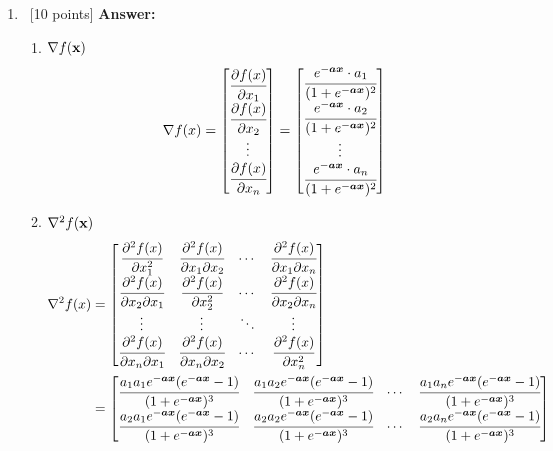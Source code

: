 \documentclass[12pt, fullpage,letterpaper]{article}
\begin{document}
\begin{enumerate}
\item~[10 points]
\textbf{Answer:}
\begin{enumerate}
\item $\nabla f({\bf x})$
\[
\nabla f(x)
=
\begin{bmatrix}
\cfrac{\partial f(x)}{\partial x_1} \\
\cfrac{\partial f(x)}{\partial x_2} \\
\vdots\\
\cfrac{\partial f(x)}{\partial x_n} \\
\end{bmatrix}
=
\begin{bmatrix}
\cfrac{e^{-\bm{a} \bm{x}} \cdot a_1}{(1 + e^{-\bm{a} \bm{x}})^2} \\
\cfrac{e^{-\bm{a} \bm{x}} \cdot a_2}{(1 + e^{-\bm{a} \bm{x}})^2} \\
\vdots\\
\cfrac{e^{-\bm{a} \bm{x}} \cdot a_n}{(1 + e^{-\bm{a} \bm{x}})^2} \\
\end{bmatrix}
\]
\item $\nabla^2 f({\bf x})$
\setcounter{equation}{0}
\begin{align}
\nabla^2 f(x)
&=
\begin{bmatrix}
\cfrac{\partial^2 f(x)}{\partial x_1^2} & \cfrac{\partial^2 f(x)}{\partial x_1\partial x_2} & \cdots & \cfrac{\partial^2 f(x)}{\partial x_1\partial x_n}\\
\cfrac{\partial^2 f(x)}{\partial x_2\partial x_1} & \cfrac{\partial^2 f(x)}{\partial x_2^2} & \cdots & \cfrac{\partial^2 f(x)}{\partial x_2\partial x_n} \\
\vdots & \vdots & \ddots & \vdots\\
\cfrac{\partial^2 f(x)}{\partial x_n \partial x_1} & \cfrac{\partial^2 f(x)}{\partial x_n \partial x_2} & \cdots & \cfrac{\partial^2 f(x)}{\partial x_n^2}\\
\end{bmatrix}\\
&=
\begin{bmatrix}
\cfrac{a_1a_1e^{-\bm{a}\bm{x}}(e^{-\bm{a}\bm{x}}-1)}{(1+e^{-\bm{a}\bm{x}})^3} & \cfrac{a_1a_2e^{-\bm{a}\bm{x}}(e^{-\bm{a}\bm{x}}-1)}{(1+e^{-\bm{a}\bm{x}})^3} & \cdots & \cfrac{a_1a_ne^{-\bm{a}\bm{x}}(e^{-\bm{a}\bm{x}}-1)}{(1+e^{-\bm{a}\bm{x}})^3} \\
\cfrac{a_2a_1e^{-\bm{a}\bm{x}}(e^{-\bm{a}\bm{x}}-1)}{(1+e^{-\bm{a}\bm{x}})^3} & \cfrac{a_2a_2e^{-\bm{a}\bm{x}}(e^{-\bm{a}\bm{x}}-1)}{(1+e^{-\bm{a}\bm{x}})^3} & \cdots & \cfrac{a_2a_ne^{-\bm{a}\bm{x}}(e^{-\bm{a}\bm{x}}-1)}{(1+e^{-\bm{a}\bm{x}})^3} \\

\end{bmatrix}
\end{align}
\end{enumerate}
\end{enumerate}
\end{document}
